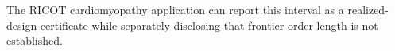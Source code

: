 The RICOT cardiomyopathy application can report this interval as a realized-design certificate while separately disclosing that frontier-order length is not established.